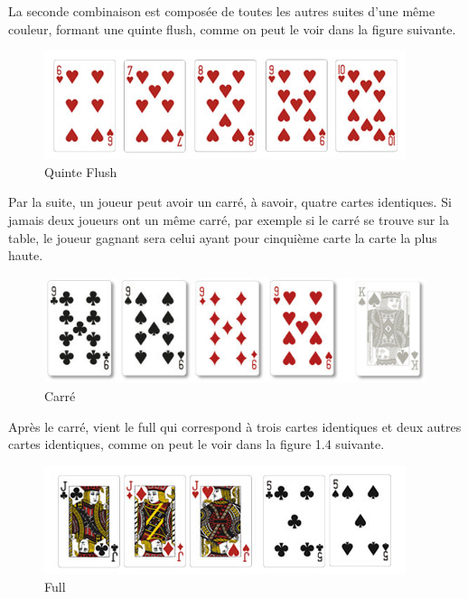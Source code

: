 \documentclass{report}
\begin{document}
La seconde combinaison est composée de toutes les autres suites d'une même couleur, formant une quinte flush, comme on peut le voir dans la figure suivante.\par

		\begin{figure}[h]
			\begin{center}
				\includegraphics[scale=0.4]{./imagesRapport/quinteFlush.jpg}
			\end{center}
			\caption[Quinte Flush]{Quinte Flush}
		\end{figure}
		\medskip
\newpage
Par la suite, un joueur peut avoir un carré, à savoir, quatre cartes identiques. Si jamais deux joueurs ont un même carré, par exemple si le carré se trouve sur la table, le joueur gagnant sera celui ayant pour cinquième carte la carte la plus haute.\par 

		\begin{figure}[h]
			\begin{center}
				\includegraphics[scale=0.3]{./imagesRapport/carre.jpg}
			\end{center}
			\caption[Carré]{Carré}
		\end{figure}
		\medskip



Après le carré, vient le full qui correspond à trois cartes identiques et deux autres cartes identiques, comme on peut le voir dans la figure 1.4 suivante. \par


		\begin{figure}[h]
			\begin{center}
				\includegraphics[scale=0.4]{./imagesRapport/full.jpg}
			\end{center}
			\caption[Full]{Full}
		\end{figure}
		\medskip
\end{document}
